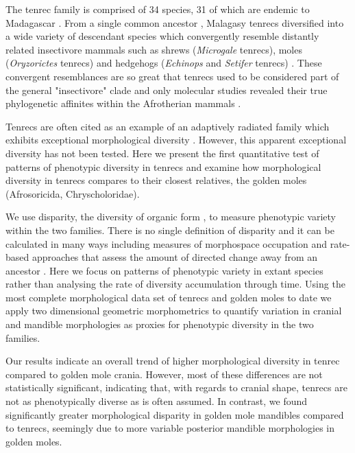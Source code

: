 \documentclass[12pt,a4paper]{article}
\begin{document}
	The tenrec family is comprised of 34 species, 31 of which are endemic to Madagascar \citep{Olson2013}. From a single common ancestor \citep{Asher2006}, Malagasy tenrecs diversified into a wide variety of descendant species which convergently resemble distantly related insectivore mammals such as shrews (\textit{Microgale} tenrecs), moles (\textit{Oryzorictes} tenrecs) and hedgehogs (\textit{Echinops} and \textit{Setifer} tenrecs) \citep{Eisenberg1969}. These convergent resemblances are so great that tenrecs used to be considered part of the general "insectivore" clade and only molecular studies revealed their true phylogenetic affinites within the Afrotherian mammals \citep{Stanhope1998}.  

	Tenrecs are often cited as an example of an adaptively radiated family which exhibits exceptional morphological diversity \citep{Soarimalala2011, Olson2003, Eisenberg1969}. However, this apparent exceptional diversity has not been tested. Here we present the first quantitative test of patterns of phenotypic diversity in tenrecs and examine how morphological diversity in tenrecs compares to their closest relatives, the golden moles (Afrosoricida, Chryscholoridae). 

	We use disparity, the diversity of organic form \citep{Foote1997, Wills1994, Erwin2007}, to measure phenotypic variety within the two families. There is no single definition of disparity and it can be calculated in many ways including measures of morphospace occupation \citep[e.g.][]{Goswami2011, Brusatte2008} and rate-based approaches that assess the amount of directed change away from an ancestor \citep{OMeara2006, Price2013}. Here we focus on patterns of phenotypic variety in extant species rather than analysing the rate of diversity accumulation through time. 
	Using the most complete morphological data set of tenrecs and golden moles to date we apply two dimensional geometric morphometrics \citep{Rohlf1993, Adams2013} to quantify variation in cranial and mandible morphologies as proxies for phenotypic diversity in the two families. 

	Our results indicate an overall trend of higher morphological diversity in tenrec compared to golden mole crania. However, most of these differences are not statistically significant, indicating that, with regards to cranial shape, tenrecs are not as phenotypically diverse as is often assumed. In contrast, we found significantly greater morphological disparity in golden mole mandibles compared to tenrecs, seemingly due to more variable posterior mandible morphologies in golden moles.
	
\end{document}
